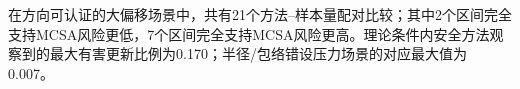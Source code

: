 在方向可认证的大偏移场景中，共有21个方法--样本量配对比较；其中2个区间完全支持MCSA风险更低，7个区间完全支持MCSA风险更高。理论条件内安全方法观察到的最大有害更新比例为0.170；半径/包络错设压力场景的对应最大值为0.007。